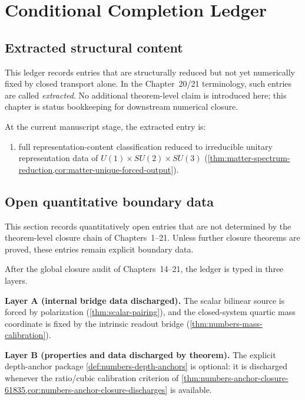 \chapter{Conditional Completion Ledger}
\label{app:conditional-completion}

\section{Extracted structural content}
\label{sec:cond-reduced}

This ledger records entries that are structurally reduced but not yet
numerically fixed by closed transport alone.
In the Chapter~20/21 terminology, such entries are called
\emph{extracted}.
No additional theorem-level claim is introduced here; this chapter is
status bookkeeping for downstream numerical closure.

At the current manuscript stage, the extracted entry is:
\begin{enumerate}[label=\textup{(\roman*)}]
\item
  full representation-content classification reduced to irreducible unitary
  representation data of
  \(U(1)\times SU(2)\times SU(3)\)
  (\cref{thm:matter-spectrum-reduction,cor:matter-unique-forced-output}).
\end{enumerate}

\section{Open quantitative boundary data}
\label{sec:cond-open}

This section records quantitatively open entries that are not determined by
the theorem-level closure chain of Chapters~1--21.
Unless further closure theorems are proved, these entries remain explicit
boundary data.

After the global closure audit of Chapters~14--21, the ledger is typed in
three layers.

\textbf{Layer A (internal bridge data discharged).}
The scalar bilinear source is forced by polarization
(\cref{thm:scalar-pairing}), and the closed-system quartic mass coordinate is
fixed by the intrinsic readout bridge
(\cref{thm:numbers-mass-calibration}).

\textbf{Layer B (properties and data discharged by theorem).}
The explicit depth-anchor package \cref{def:numbers-depth-anchors} is
optional: it is discharged whenever the ratio/cubic calibration criterion
of
\cref{thm:numbers-anchor-closure-61835,cor:numbers-anchor-closure-discharges}
is available.

